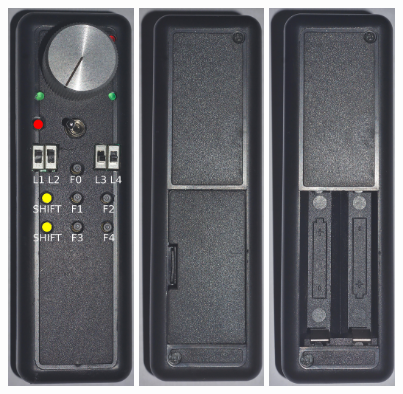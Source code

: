 \documentclass[11pt,a4paper]{scrartcl}
\begin{document}
\begin{figure}[tbh]
  
  \centering
  \includegraphics[height=100mm]{images/throttle_Front}
  \hspace{1em}
  \includegraphics[height=100mm]{images/throttle_Back}
  \hspace{1em}
  \includegraphics[height=100mm]{images/throttle_Back_openBattery}


\end{figure}
\end{document}
